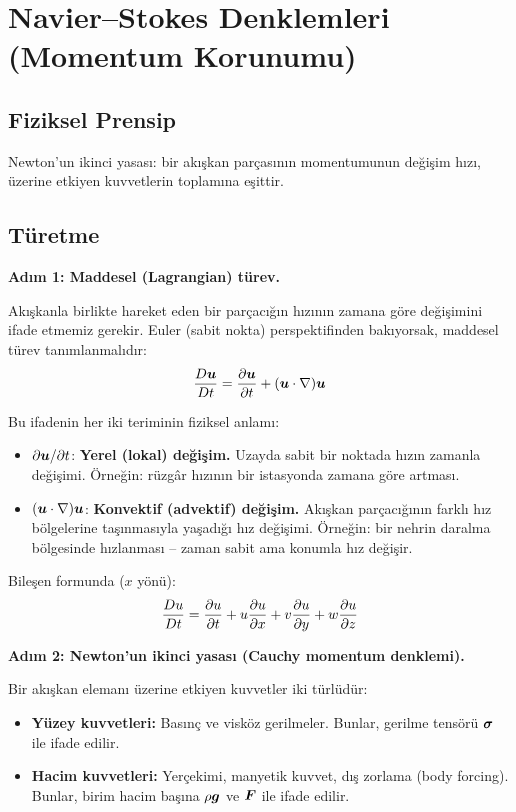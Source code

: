 \section{Navier--Stokes Denklemleri (Momentum Korunumu)}
\label{sec:navier_stokes}

\subsection{Fiziksel Prensip}
Newton'un ikinci yasası: bir akışkan parçasının momentumunun değişim hızı, üzerine etkiyen kuvvetlerin toplamına eşittir.

\subsection{Türetme}

\textbf{Adım 1: Maddesel (Lagrangian) türev.}

Akışkanla birlikte hareket eden bir parçacığın hızının zamana göre değişimini ifade etmemiz gerekir. Euler (sabit nokta) perspektifinden bakıyorsak, maddesel türev tanımlanmalıdır:
\begin{equation}
    \frac{D \bm{u}}{Dt} = \frac{\partial \bm{u}}{\partial t} + (\bm{u} \cdot \nabla)\bm{u}
    \label{eq:material_derivative}
\end{equation}

Bu ifadenin her iki teriminin fiziksel anlamı:
\begin{itemize}
    \item $\partial \bm{u}/\partial t$: \textbf{Yerel (lokal) değişim.} Uzayda sabit bir noktada hızın zamanla değişimi. Örneğin: rüzgâr hızının bir istasyonda zamana göre artması.
    \item $(\bm{u}\cdot\nabla)\bm{u}$: \textbf{Konvektif (advektif) değişim.} Akışkan parçacığının farklı hız bölgelerine taşınmasıyla yaşadığı hız değişimi. Örneğin: bir nehrin daralma bölgesinde hızlanması -- zaman sabit ama konumla hız değişir.
\end{itemize}

Bileşen formunda ($x$ yönü):
\begin{equation}
    \frac{D u}{Dt} = \frac{\partial u}{\partial t} + u\frac{\partial u}{\partial x} + v\frac{\partial u}{\partial y} + w\frac{\partial u}{\partial z}
\end{equation}

\textbf{Adım 2: Newton'un ikinci yasası (Cauchy momentum denklemi).}

Bir akışkan elemanı üzerine etkiyen kuvvetler iki türlüdür:
\begin{itemize}
    \item \textbf{Yüzey kuvvetleri:} Basınç ve visköz gerilmeler. Bunlar, gerilme tensörü $\bm{\mathsf{\sigma}}$ ile ifade edilir.
    \item \textbf{Hacim kuvvetleri:} Yerçekimi, manyetik kuvvet, dış zorlama (body forcing). Bunlar, birim hacim başına $\rho\bm{g}$ ve $\bm{F}$ ile ifade edilir.
\end{itemize}

